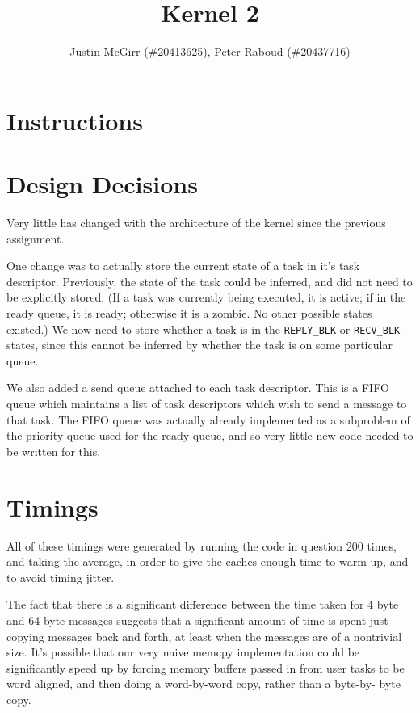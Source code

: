 \documentclass[titlepage]{article}
\begin{document}
\title{Kernel 2}
\author{Justin McGirr (\#20413625), Peter Raboud (\#20437716)}
\maketitle

\section{Instructions}


\section{Design Decisions}
Very little has changed with the architecture of the kernel since the previous assignment.

One change was to actually store the current state of a task in it's task descriptor.
Previously, the state of the task could be inferred, and did not need to be explicitly stored.
(If a task was currently being executed, it is active; if in the ready queue, it is ready; otherwise
it is a zombie. No other possible states existed.)
We now need to store whether a task is in the \texttt{REPLY\_BLK} or \texttt{RECV\_BLK} states,
since this cannot be inferred by whether the task is on some particular queue.

We also added a send queue attached to each task descriptor.
This is a FIFO queue which maintains a list of task descriptors which wish to send a message
to that task.
The FIFO queue was actually already implemented as a subproblem of the priority queue used
for the ready queue, and so very little new code needed to be written for this.

\section{Timings}
All of these timings were generated by running the code in question 200 times,
and taking the average, in order to give the caches enough time to warm up, and
to avoid timing jitter.



The fact that there is a significant difference between the time taken for 4
byte and 64 byte messages suggests that a significant amount of time is spent
just copying messages back and forth, at least when the messages are of a
nontrivial size. It's possible that our very naive memcpy implementation could
be significantly speed up by forcing memory buffers passed in from user tasks
to be word aligned, and then doing a word-by-word copy, rather than a byte-by-
byte copy.
\end{document}
